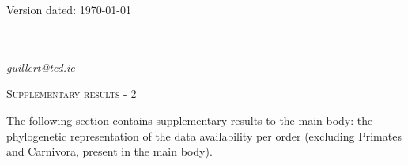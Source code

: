 \documentclass[12pt,letterpaper]{article}
\renewcommand{\section}[1]{%
\bigskip
\begin{center}
\begin{Large}
\normalfont\scshape #1
\medskip
\end{Large}
\end{center}}
\begin{document}
\newcommand{\beginsupplement}{%
    \setcounter{table}{0}
    \renewcommand{\thetable}{S\arabic{table}}%
    \setcounter{figure}{0}
    \renewcommand{\thefigure}{S\arabic{figure}}%
}

\begin{flushright}
Version dated: \today
\end{flushright}

\bigskip
\medskip
\begin{center}


\bigskip
{}

\bigskip
{}\\
\\
\medskip
{} \textit{guillert@tcd.ie}\\  
\vspace{1in}

\end{center}


\newpage





\section{Supplementary results - 2}
The following section contains supplementary results to the main body: the phylogenetic representation of the data availability per order (excluding Primates and Carnivora, present in the main body).
\end{document}
